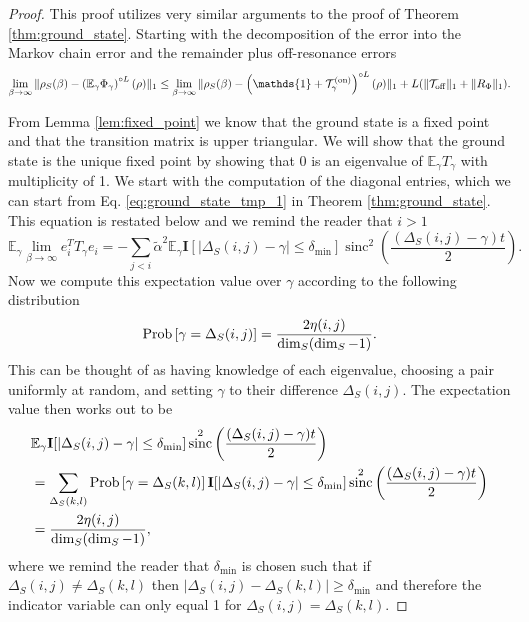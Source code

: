 \documentclass{article}
\newcommand{\on}{\rm on}
\newcommand{\off}{\rm off}
\newcommand{\norm}[1]{\| #1 \|}
\newcommand{\EE}{\mathbb{E}}
\newcommand{\TT}{\mathcal{T}}
\newcommand{\prob}[1]{{\rm Prob}\left[ #1 \right]}
\newcommand{\identity}{\mathds{1}}
\DeclareMathOperator{\sinc}{sinc}
\begin{document}
\begin{proof}
    This proof utilizes very similar arguments to the proof of Theorem \ref{thm:ground_state}. Starting with the decomposition of the error into the Markov chain error and the remainder plus off-resonance errors
    \begin{equation}
        \lim_{\beta \to \infty} \norm{\rho_S(\beta) - \left(\EE_\gamma \Phi_\gamma \right)^{\circ L} (\rho)}_1 \le \lim_{\beta \to \infty} \norm{\rho_S(\beta) - \left(\identity + \TT_\gamma^{(\on)} \right)^{\circ L} (\rho)}_1 + L ( \norm{\TT_{\off}}_1 + \norm{R_{\Phi}}_1).
    \end{equation}
    
    From Lemma \ref{lem:fixed_point} we know that the ground state is a fixed point and that the transition matrix is upper triangular. We will show that the ground state is the unique fixed point by showing that 0 is an eigenvalue of $\EE_\gamma T_\gamma$ with multiplicity of 1. We start with the computation of the diagonal entries, which we can start from Eq. \eqref{eq:ground_state_tmp_1} in Theorem \ref{thm:ground_state}. This equation is restated below and we remind the reader that $i > 1$
    \begin{equation}
        \EE_\gamma \lim_{\beta \to \infty} e_i^T T_\gamma e_i = -   \sum_{j < i} \widetilde{\alpha}^2 \EE_\gamma \mathbf{I}[|\Delta_S(i,j) - \gamma| \le \delta_{\min}] \sinc^2 \left( \frac{(\Delta_S(i, j) - \gamma) t}{2} \right).
    \end{equation}
    Now we compute this expectation value over $\gamma$ according to the following distribution
    \begin{equation}
        \prob{\gamma = \Delta_S(i,j)} = \frac{2 \eta(i,j)}{\dim_S(\dim_S - 1)}.
    \end{equation}
    This can be thought of as having knowledge of each eigenvalue, choosing a pair uniformly at random, and setting $\gamma$ to their difference $\Delta_S(i,j)$. The expectation value then works out to be
    \begin{align}
        &\EE_\gamma \mathbf{I}[|\Delta_S(i,j) - \gamma| \le \delta_{\min}] \sinc^2 \left( \frac{(\Delta_S(i, j) - \gamma) t}{2} \right) \nonumber \\
        &= \sum_{\Delta_S(k,l)} \prob{\gamma = \Delta_S(k,l)} \mathbf{I}[|\Delta_S(i,j) - \gamma| \le \delta_{\min}] \sinc^2 \left( \frac{(\Delta_S(i, j) - \gamma) t}{2} \right) \\
        &= \frac{2 \eta(i,j)}{\dim_S (\dim_S - 1)},
    \end{align}
    where we remind the reader that $\delta_{\min}$ is chosen such that if $\Delta_S(i,j) \neq \Delta_S(k,l)$ then $|\Delta_S(i,j) - \Delta_S(k,l)| \ge \delta_{\min}$ and therefore the indicator variable can only equal 1 for $\Delta_S(i,j) = \Delta_S(k,l)$. 


\end{proof}
\end{document}

